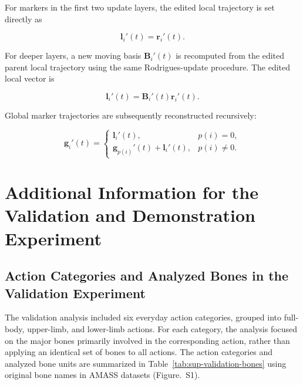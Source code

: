 \documentclass[12pt]{article}
\begin{document}
For markers in the first two update layers, the edited local trajectory
is set directly as

\begin{equation}
\mathbf{l}_i'(t)
=
\mathbf{r}_i'(t).
\label{eq:sup-pld-first-layers-reconstruction}
\end{equation}

For deeper layers, a new moving basis
$\mathbf{B}_i'(t)$ is recomputed from the edited parent local trajectory
using the same Rodrigues-update procedure. The edited local vector is

\begin{equation}
\mathbf{l}_i'(t)
=
\mathbf{B}_i'(t)
\mathbf{r}_i'(t).
\label{eq:sup-pld-local-reconstruction}
\end{equation}

Global marker trajectories are subsequently reconstructed recursively:

\begin{equation}
\mathbf{g}_i'(t)
=
\begin{cases}
\mathbf{l}_i'(t),
& p(i)=0, \\[6pt]
\mathbf{g}_{p(i)}'(t)
+
\mathbf{l}_i'(t),
& p(i)\neq0.
\end{cases}
\label{eq:sup-global-reconstruction}
\end{equation}

\section{Additional Information for the Validation and Demonstration Experiment}
\label{sup:demonstration}

\subsection{Action Categories and Analyzed Bones in the Validation Experiment}
\label{sup:validation-actions}

The validation analysis included six everyday action categories, grouped into
full-body, upper-limb, and lower-limb actions. For each category, the analysis
focused on the major bones primarily involved in the corresponding action,
rather than applying an identical set of bones to all actions. The action
categories and analyzed bone units are summarized in
Table~\ref{tab:sup-validation-bones} using original bone names in AMASS datasets (Figure.~S1).
\end{document}
